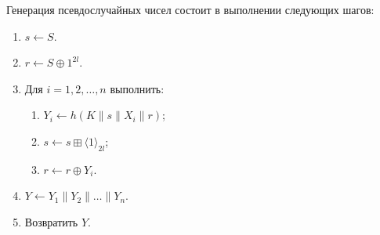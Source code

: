 Генерация псевдослучайных чисел состоит в выполнении следующих шагов:
\begin{enumerate}
\item
$s\leftarrow S$.
\item
$r\leftarrow S\oplus 1^{2l}$.
\item
Для $i=1,2,\ldots,n$ выполнить:
\begin{enumerate}
\item
$Y_i\leftarrow h(K\parallel s\parallel X_i\parallel r)$;
\item
$s\leftarrow s\boxplus \langle 1\rangle_{2l}$;
\item
$r\leftarrow r\oplus Y_i$.
\end{enumerate}
\item
$Y\leftarrow Y_1\parallel Y_2\parallel\ldots\parallel Y_n$.
\item
Возвратить $Y$.
\end{enumerate}

